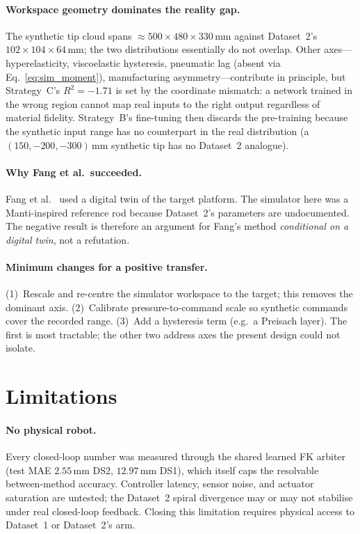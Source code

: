 \paragraph{Workspace geometry dominates the reality gap.}
The synthetic tip cloud spans $\approx 500 \times 480 \times 330$\,mm against Dataset~2's $102 \times 104 \times 64$\,mm; the two distributions essentially do not overlap. Other axes---hyperelasticity, viscoelastic hysteresis, pneumatic lag (absent via Eq.~\eqref{eq:sim_moment}), manufacturing asymmetry---contribute in principle, but Strategy~C's $R^{2} = -1.71$ is set by the coordinate mismatch: a network trained in the wrong region cannot map real inputs to the right output regardless of material fidelity. Strategy~B's fine-tuning then discards the pre-training because the synthetic input range has no counterpart in the real distribution (a $(150,-200,-300)$\,mm synthetic tip has no Dataset~2 analogue).

\paragraph{Why Fang et al.\ succeeded.}
Fang et al.\ \cite{fang2022jacobian} used a digital twin of the target platform. The simulator here was a Manti-inspired reference rod because Dataset~2's parameters are undocumented. The negative result is therefore an argument for Fang's method \emph{conditional on a digital twin}, not a refutation.

\paragraph{Minimum changes for a positive transfer.}
(1)~Rescale and re-centre the simulator workspace to the target; this removes the dominant axis. (2)~Calibrate pressure-to-command scale so synthetic commands cover the recorded range. (3)~Add a hysteresis term (e.g.\ a Preisach layer). The first is most tractable; the other two address axes the present design could not isolate.

\section{Limitations}
\label{sec:disc_limitations}

\paragraph{No physical robot.}
\label{sec:disc_lim_hw}
Every closed-loop number was measured through the shared learned FK arbiter (test MAE $2.55$\,mm DS2, $12.97$\,mm DS1), which itself caps the resolvable between-method accuracy. Controller latency, sensor noise, and actuator saturation are untested; the Dataset~2 spiral divergence may or may not stabilise under real closed-loop feedback. Closing this limitation requires physical access to Dataset~1 or Dataset~2's arm.

